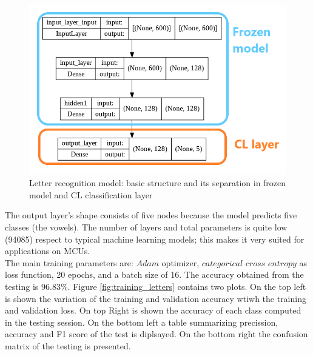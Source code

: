 \documentclass[12pt]{report}
\begin{document}
\begin{figure}[h!]
    \centering
    \includegraphics[width=120mm]{Figures/Chapter4/letter_structure.png} 
    \caption{Letter recognition model: basic structure and its separation in frozen model and CL classification layer}
    \label{fig:letter_structure}    
\end{figure}

The output layer's shape consists of five nodes because the model predicts five classes (the vowels). The number of layers and total parameters is quite low (94085) respect to typical machine learning models; this makes it very suited for applications on MCUs. \\
The main training parameters are: $Adam$ optimizer, $categorical$ $cross$ $entropy$ as loss function, 20 epochs, and a batch size of 16. 
The accuracy obtained from the testing is 96.83\%. Figure \ref{fig:training_letters} contains two plots. On the top left is shown the variation of the training and validation accuracy wtiwh the training and validation loss. On top Right is shown the accuracy of each class computed in the testing session. On the bottom left a table summarizing precission, accuracy and F1 score of the test is diplsayed. On the bottom right the confusion matrix of the testing is presented.\\
\end{document}
